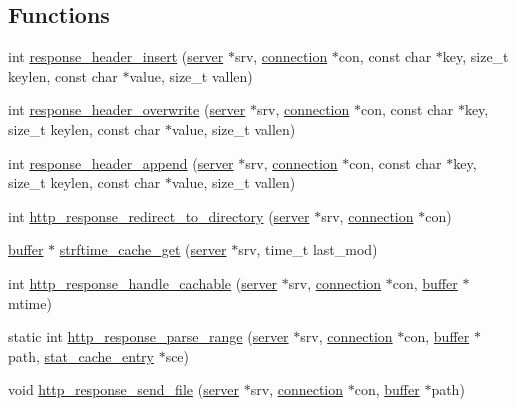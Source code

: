 \subsection*{Functions}
\begin{DoxyCompactItemize}
\item 
int \hyperlink{http-header-glue_8c_af843f4449790d30e96e67c7f65cc225e}{response\-\_\-header\-\_\-insert} (\hyperlink{structserver}{server} $\ast$srv, \hyperlink{structconnection}{connection} $\ast$con, const char $\ast$key, size\-\_\-t keylen, const char $\ast$value, size\-\_\-t vallen)
\item 
int \hyperlink{http-header-glue_8c_aca062a70078c8b89bb2fc0c09d38a348}{response\-\_\-header\-\_\-overwrite} (\hyperlink{structserver}{server} $\ast$srv, \hyperlink{structconnection}{connection} $\ast$con, const char $\ast$key, size\-\_\-t keylen, const char $\ast$value, size\-\_\-t vallen)
\item 
int \hyperlink{http-header-glue_8c_a3ce3b22086acdc60b94f0a4c9ea60e86}{response\-\_\-header\-\_\-append} (\hyperlink{structserver}{server} $\ast$srv, \hyperlink{structconnection}{connection} $\ast$con, const char $\ast$key, size\-\_\-t keylen, const char $\ast$value, size\-\_\-t vallen)
\item 
int \hyperlink{http-header-glue_8c_ab5cf9b8d7ff0facd7b5334514de07a15}{http\-\_\-response\-\_\-redirect\-\_\-to\-\_\-directory} (\hyperlink{structserver}{server} $\ast$srv, \hyperlink{structconnection}{connection} $\ast$con)
\item 
\hyperlink{structbuffer}{buffer} $\ast$ \hyperlink{http-header-glue_8c_ae0692991b1b43d85e062a3eacd5d176c}{strftime\-\_\-cache\-\_\-get} (\hyperlink{structserver}{server} $\ast$srv, time\-\_\-t last\-\_\-mod)
\item 
int \hyperlink{http-header-glue_8c_a62af03671bb5ddd52237444182aead90}{http\-\_\-response\-\_\-handle\-\_\-cachable} (\hyperlink{structserver}{server} $\ast$srv, \hyperlink{structconnection}{connection} $\ast$con, \hyperlink{structbuffer}{buffer} $\ast$mtime)
\item 
static int \hyperlink{http-header-glue_8c_a62168175923482432ea74bc0cafdf2b6}{http\-\_\-response\-\_\-parse\-\_\-range} (\hyperlink{structserver}{server} $\ast$srv, \hyperlink{structconnection}{connection} $\ast$con, \hyperlink{structbuffer}{buffer} $\ast$path, \hyperlink{structstat__cache__entry}{stat\-\_\-cache\-\_\-entry} $\ast$sce)
\item 
void \hyperlink{http-header-glue_8c_a4ad4018401db78887e2b6a48b6a9c89b}{http\-\_\-response\-\_\-send\-\_\-file} (\hyperlink{structserver}{server} $\ast$srv, \hyperlink{structconnection}{connection} $\ast$con, \hyperlink{structbuffer}{buffer} $\ast$path)

\end{DoxyCompactItemize}

